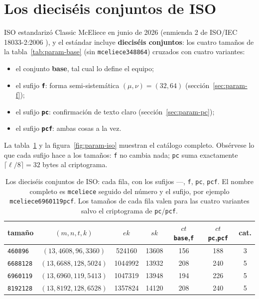 \section{Los dieciséis conjuntos de ISO}\label{sec:param-iso}

ISO estandarizó Classic McEliece en junio de 2026 (enmienda 2 de
ISO/IEC 18033-2:2006 \cite{iso18033}), y el estándar incluye
\textbf{dieciséis conjuntos}: los cuatro tamaños de la
tabla~\ref{tab:param-base} (sin \texttt{mceliece348864}) cruzados con
cuatro variantes:

\begin{itemize}[leftmargin=1.5em,itemsep=2pt]
  \item el conjunto \textbf{base}, tal cual lo define el equipo;
  \item el sufijo \textbf{\texttt{f}}: forma semi-sistemática
        $(\mu,\nu)=(32{,}64)$ (sección~\ref{sec:param-f});
  \item el sufijo \textbf{\texttt{pc}}: confirmación de texto claro
        (sección~\ref{sec:param-pc});
  \item el sufijo \textbf{\texttt{pcf}}: ambas cosas a la vez.
\end{itemize}

La tabla~\ref{tab:param-iso} y la figura~\ref{fig:param-iso} muestran
el catálogo completo. Obsérvese lo que cada sufijo hace a los tamaños:
\texttt{f} no cambia nada; \texttt{pc} suma exactamente
$\lceil\ell/8\rceil=32$ bytes al criptograma.

\begin{table}[htbp]
\centering
\small
\setlength{\tabcolsep}{6pt}
\begin{tabular}{lcccccc}
\toprule
tamaño & $(m,n,t,k)$ & $ek$ & $sk$ & $ct$ \texttt{base},\texttt{f} & $ct$ \texttt{pc},\texttt{pcf} & cat.\\
\midrule
\texttt{460896}  & $(13,4608,96,3360)$  & \num{524160}  & \num{13608} & 156 & 188 & 3\\
\texttt{6688128} & $(13,6688,128,5024)$ & \num{1044992} & \num{13932} & 208 & 240 & 5\\
\texttt{6960119} & $(13,6960,119,5413)$ & \num{1047319} & \num{13948} & 194 & 226 & 5\\
\texttt{8192128} & $(13,8192,128,6528)$ & \num{1357824} & \num{14120} & 208 & 240 & 5\\
\bottomrule
\end{tabular}
\caption[Los dieciséis conjuntos de ISO, cada fila con sus cuatro variantes.]{Los dieciséis conjuntos de ISO: cada fila, con los sufijos
---, \texttt{f}, \texttt{pc}, \texttt{pcf}. El nombre completo es
\texttt{mceliece} seguido del número y el sufijo, por ejemplo
\texttt{mceliece6960119pcf}. Los tamaños de cada fila valen para las
cuatro variantes salvo el criptograma de \texttt{pc}/\texttt{pcf}.}
\label{tab:param-iso}
\end{table}


